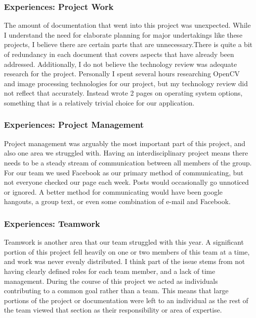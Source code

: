 \documentclass[onecolumn, draftclsnofoot,10pt, compsoc]{IEEEtran}
\begin{document}
\subsubsection{Experiences: Project Work}
The amount of documentation that went into this project was unexpected. While I understand the need for elaborate planning for major undertakings like these projects, I believe there are certain parts that are unnecessary.There is quite a bit of redundancy in each document that covers aspects that have already been addressed. Additionally, I do not believe the technology review was adequate research for the project. Personally I spent several hours researching OpenCV and image processing technologies for our project, but my technology review did not reflect that accurately. Instead wrote 2 pages on operating system options, something that is a relatively trivial choice for our application. 

\subsubsection{Experiences: Project Management}
Project management was arguably the most important part of this project, and also one area we struggled with. Having an interdisciplinary project means there needs to be a steady stream of communication between all members of the group. For our team we used Facebook as our primary method of communicating, but not everyone checked our page each week. Posts would occasionally go unnoticed or ignored. A better method for communicating would have been google hangouts, a group text, or even some combination of e-mail and Facebook.

\subsubsection{Experiences: Teamwork}
Teamwork is another area that our team struggled with this year. A significant portion of this project fell heavily on one or two members of this team at a time, and work was never evenly distributed. I think part of the issue stems from not having clearly defined roles for each team member, and a lack of time management. During the course of this project we acted as individuals contributing to a common goal rather than a team. This means that large portions of the project or documentation were left to an individual as the rest of the team viewed that section as their responsibility or area of expertise.  
\end{document}
